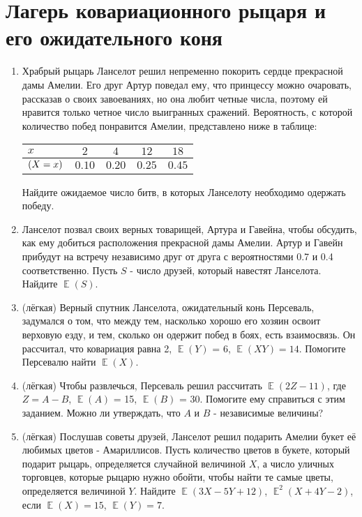 \documentclass[a4paper,12pt]{article}
\DeclareMathOperator{\E}{\mathbb{E}}
\let\P\relax
\DeclareMathOperator{\P}{\mathbb{P}}
\begin{document}
\section{Лагерь ковариационного рыцаря и его ожидательного коня}
\begin{enumerate} %
\item Храбрый рыцарь Ланселот решил непременно покорить сердце прекрасной дамы Амелии. Его друг Артур поведал ему, что принцессу можно очаровать, рассказав о своих завоеваниях, но она любит четные числа, поэтому ей нравится только четное число выигранных сражений. Вероятность, с которой количество побед понравится Амелии, представлено ниже в таблице:
\begin{center}\begin{tabular}{lcccc}
\toprule
 $x$     & $2$  & $4$   & $12$ & $18$  \\ \midrule
$\P(X=x)$                 & $0.10$ & $0.20$ & $0.25$ & $0.45$\\
 \bottomrule
\end{tabular}\end{center}
Найдите ожидаемое число битв, в которых Ланселоту необходимо одержать победу.
\item Ланселот позвал своих верных товарищей, Артура и Гавейна, чтобы обсудить, как ему добиться расположения прекрасной дамы Амелии. Артур и Гавейн прибудут на встречу независимо друг от друга с вероятностями 0.7 и 0.4 соответственно. Пусть $S$ - число друзей, который навестят Ланселота. Найдите $\E(S)$.
\item (лёгкая) Верный спутник Ланселота, ожидательный конь Персеваль, задумался о том, что между тем, насколько хорошо его хозяин освоит верховую езду, и тем, сколько он одержит побед в боях, есть взаимосвязь. Он рассчитал, что ковариация равна 2, $\E(Y)$ = 6, $\E(XY) = 14$. Помогите Персевалю найти $\E(X)$.
\item (лёгкая) Чтобы развлечься, Персеваль решил рассчитать $\E(2Z-11)$, где $Z=A-B$, $\E(A)$ = 15, $\E(B)$ = 30. Помогите ему справиться с этим заданием. Можно ли утверждать, что $A$ и $B$ - независимые величины?
\item (лёгкая) Послушав советы друзей, Ланселот решил подарить Амелии букет её любимых цветов - Амариллисов. Пусть количество цветов в букете, который подарит рыцарь, определяется случайной величиной $X$, а число уличных торговцев, которые рыцарю нужно обойти, чтобы найти те самые цветы, определяется величиной $Y$. Найдите $\E(3X-5Y+12)$, $\E^2(X+4Y-2)$, если $\E(X)=15$, $\E(Y)=7$.
\end{enumerate}
\end{document}
